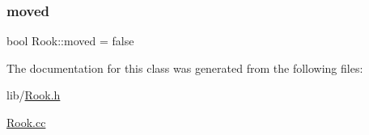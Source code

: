 \subsubsection{\texorpdfstring{moved}{moved}}
{\footnotesize\ttfamily bool Rook\+::moved = false\hspace{0.3cm}{\ttfamily [private]}}



The documentation for this class was generated from the following files\+:\begin{DoxyCompactItemize}
\item 
lib/\hyperlink{_rook_8h}{Rook.\+h}\item 
\hyperlink{_rook_8cc}{Rook.\+cc}\end{DoxyCompactItemize}
